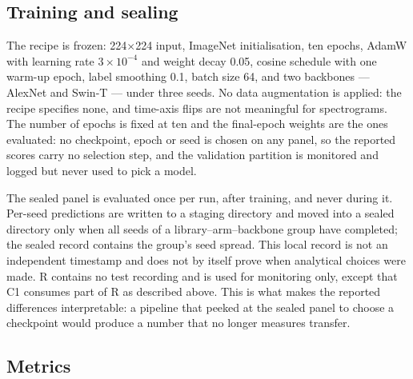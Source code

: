\subsection{Training and sealing}

The recipe is frozen: 224$\times$224 input, ImageNet initialisation, ten epochs, AdamW with
learning rate $3\times10^{-4}$ and weight decay 0.05, cosine schedule with one warm-up epoch,
label smoothing 0.1, batch size 64, and two backbones --- AlexNet \citep{alexnet2012} and
Swin-T \citep{swin2021} --- under three seeds.
No data augmentation is applied: the recipe specifies none, and time-axis flips are not
meaningful for spectrograms. The number of epochs is fixed at ten and the final-epoch weights are
the ones evaluated: no checkpoint, epoch or seed is chosen on any panel, so the reported scores
carry no selection step, and the validation partition is monitored and logged but never used to
pick a model.

The sealed panel is evaluated once per run, after training, and never during it. Per-seed
predictions are written to a staging directory and moved into a sealed directory only when all
seeds of a library--arm--backbone group have completed; the sealed record contains the
group's seed spread. This local record is not an independent timestamp and does not by itself
prove when analytical choices were made. R contains no test
recording and is used for monitoring only, except that C1 consumes part of R as described above. This is what makes the reported differences interpretable: a
pipeline that peeked at the sealed panel to choose a checkpoint would produce a number that no
longer measures transfer.

\subsection{Metrics}

